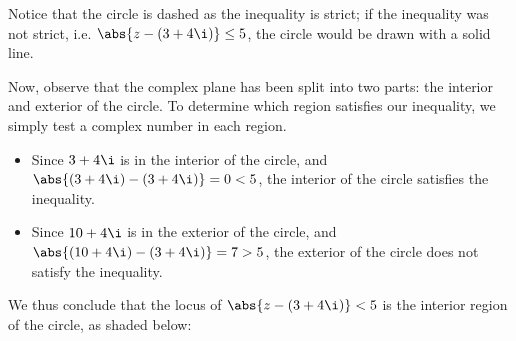 Notice that the circle is dashed as the inequality is strict; if the inequality was not strict, i.e. $\abs{z - (3 + 4\i)} \leq 5$, the circle would be drawn with a solid line.

Now, observe that the complex plane has been split into two parts: the interior and exterior of the circle. To determine which region satisfies our inequality, we simply test a complex number in each region.
\begin{itemize}
    \item Since $3 + 4\i$ is in the interior of the circle, and $\abs{(3 + 4\i) - (3 + 4\i)} = 0 < 5$, the interior of the circle satisfies the inequality.
    \item Since $10 + 4\i$ is in the exterior of the circle, and $\abs{(10 + 4\i) - (3 + 4\i)} = 7 > 5$, the exterior of the circle does not satisfy the inequality.
\end{itemize}

We thus conclude that the locus of $\abs{z - (3 + 4\i)} < 5$ is the interior region of the circle, as shaded below:

\begin{figure}[H]
    \centering
    \caption{}
\end{figure}

